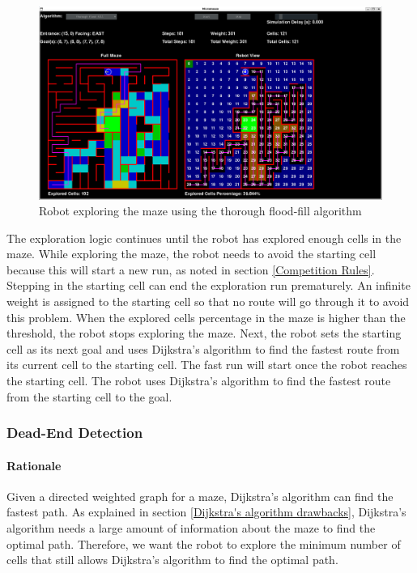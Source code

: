 \documentclass[12pt]{article}
\begin{document}
\begin{figure}[H]
\centering
\includegraphics[width=\textwidth]{images/thorough_search.png}
\caption{Robot exploring the \gls{maze} using the thorough flood-fill algorithm}
\label{thorough flood-fill exploring}
\end{figure}

The exploration logic continues until the robot has explored enough \gls{cell}s in the \gls{maze}.
While exploring the \gls{maze}, the robot needs to avoid the starting \gls{cell} because this will start a new run, as noted in section \ref{Competition Rules}.
Stepping in the starting \gls{cell} can end the exploration run prematurely.
An infinite weight is assigned to the starting \gls{cell} so that no route will go through it to avoid this problem.
When the explored \gls{cell}s percentage in the \gls{maze} is higher than the threshold, the robot stops exploring the \gls{maze}.
Next, the robot sets the starting \gls{cell} as its next goal and uses Dijkstra's algorithm to find the fastest route from its current \gls{cell} to the starting \gls{cell}.
The fast run will start once the robot reaches the starting \gls{cell}.
The robot uses Dijkstra's algorithm to find the fastest route from the starting \gls{cell} to the goal.

\subsubsection{Dead-End Detection}
\paragraph{Rationale}
Given a directed weighted \gls{graph} for a \gls{maze}, Dijkstra's algorithm can find the fastest path.
As explained in section \ref{Dijkstra's algorithm drawbacks}, Dijkstra's algorithm needs a large amount of information about the \gls{maze} to find the optimal path.
Therefore, we want the robot to explore the minimum number of \gls{cell}s that still allows Dijkstra's algorithm to find the optimal path.
\end{document}
